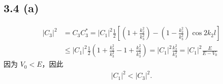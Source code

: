 \subsection{3.4 (a)}
\begin{align}
    |C_3|^2 &= C_3C_3^* = |C_1|^2 \frac12 \left[
        \left(1 + \frac{k_2^2}{k_3^2}\right) - 
        \left(1 - \frac{k_2^2}{k_3^2}\right) \cos 2k_2l
    \right] \\
    &\leqslant |C_1|^2 \frac12 \left(
        1 + \frac{k_2^2}{k_3^2} - 1 + \frac{k_2^2}{k_3^2}
    \right) = |C_1|^2 \frac{k_2^2}{k_3^2} = |C_1|^2 \frac{E}{E - V_0}
\end{align}
因为 $V_0 < E$，因此
\begin{align}
    |C_1|^2 < |C_3|^2.
\end{align}

